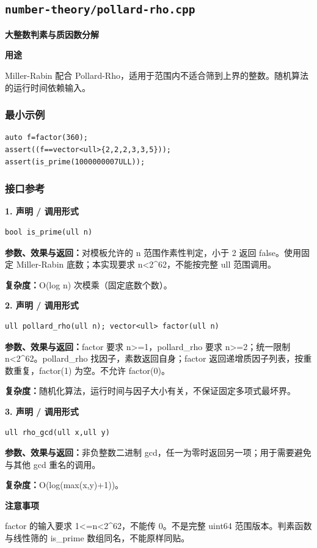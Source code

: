 \documentclass[UTF8,a4paper,10pt]{ctexart}
\newcommand{\TemplUsage}[1]{\textbf{用途}\par #1\par}
\newcommand{\TemplNote}[1]{\textbf{注意事项}\par #1\par}
\begin{document}
\subsection{\texttt{number-theory/pollard-rho.cpp}}
\textbf{大整数判素与质因数分解}\par
\TemplUsage{Miller-Rabin 配合 Pollard-Rho，适用于范围内不适合筛到上界的整数。随机算法的运行时间依赖输入。}
\subsubsection*{最小示例}
\begin{lstlisting}
auto f=factor(360);
assert((f==vector<ull>{2,2,2,3,3,5}));
assert(is_prime(1000000007ULL));
\end{lstlisting}
\subsubsection*{接口参考}
\noindent\begin{minipage}{\textwidth}
\textbf{1. 声明 / 调用形式}
\begin{lstlisting}
bool is_prime(ull n)
\end{lstlisting}
\textbf{参数、效果与返回：}对模板允许的 n 范围作素性判定，小于 2 返回 false。使用固定 Miller-Rabin 底数；本实现要求 n<2\textasciicircum{}62，不能按完整 ull 范围调用。

\textbf{复杂度：}O(log n) 次模乘（固定底数个数）。

\end{minipage}\par\vspace{0.4em}
\noindent\begin{minipage}{\textwidth}
\textbf{2. 声明 / 调用形式}
\begin{lstlisting}
ull pollard_rho(ull n); vector<ull> factor(ull n)
\end{lstlisting}
\textbf{参数、效果与返回：}factor 要求 n>=1，pollard\_rho 要求 n>=2；统一限制 n<2\textasciicircum{}62。pollard\_rho 找因子，素数返回自身；factor 返回递增质因子列表，按重数重复，factor(1) 为空。不允许 factor(0)。

\textbf{复杂度：}随机化算法，运行时间与因子大小有关，不保证固定多项式最坏界。

\end{minipage}\par\vspace{0.4em}
\noindent\begin{minipage}{\textwidth}
\textbf{3. 声明 / 调用形式}
\begin{lstlisting}
ull rho_gcd(ull x,ull y)
\end{lstlisting}
\textbf{参数、效果与返回：}非负整数二进制 gcd，任一为零时返回另一项；用于需要避免与其他 gcd 重名的调用。

\textbf{复杂度：}O(log(max(x,y)+1))。

\TemplNote{factor 的输入要求 1<=n<2\textasciicircum{}62，不能传 0。不是完整 uint64 范围版本。判素函数与线性筛的 is\_prime 数组同名，不能原样同贴。}
\end{minipage}\par\vspace{0.4em}
\clearpage
\end{document}
